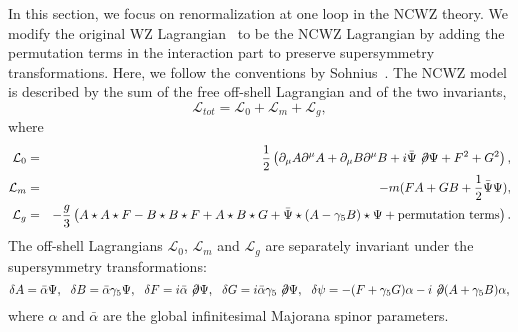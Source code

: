 \documentclass[a4paper,a4paper]{article}
\def\diracop{\not\negthinspace\partial}
\begin{document}
In this section, we focus on renormalization at one loop in the NCWZ theory. 
We modify the original WZ Lagrangian~\cite{WZ,IZ} 
to be the NCWZ Lagrangian by adding the permutation terms 
in the interaction part to preserve supersymmetry transformations.
Here, we follow the conventions by Sohnius~\cite{Soh}. The NCWZ model 
is described by the sum of the free off-shell Lagrangian and of the two invariants, 
\begin{equation}
\mathcal{L}_{tot} = \mathcal{L}_0 + \mathcal{L}_m + \mathcal{L}_g,
\label{NCWZ1}
\end{equation}
where
\begin{eqnarray}
\mathcal{L}_0 & = & \frac 12\left(\partial_\mu A \partial^\mu A 
+ \partial_\mu B \partial^\mu B +i\bar{\Psi} \diracop\Psi + F^2 + G^2\right),\\
\mathcal{L}_m & = & -m(FA+GB+\frac 12 \bar{\Psi} \Psi),\\
\mathcal{L}_g & = & -\frac g3\left(A\star A\star F-B\star B\star F+A\star B\star G+
\bar{\Psi}\star(A-\gamma_5 B)\star\Psi + \hbox{permutation terms} \right).
\label{NCWZ2}
\end{eqnarray}
The off-shell Lagrangians $\mathcal{L}_0$, $\mathcal{L}_m$ and $\mathcal{L}_g$ are separately invariant 
under the supersymmetry transformations:
\begin{equation}
\delta A=\bar{\alpha}\Psi,~~ 
\delta B=\bar{\alpha}\gamma_5\Psi,~~
\delta F=i\bar{\alpha}\diracop\Psi,~~
\delta G=i\bar{\alpha}\gamma_5\diracop\Psi,~~ 
\delta \psi=-(F+\gamma_5G)\alpha-i\diracop(A+\gamma_5B)\alpha, 
\end{equation}
where $\alpha$ and $\bar{\alpha}$ are the global infinitesimal Majorana spinor 
parameters. 
\end{document}
